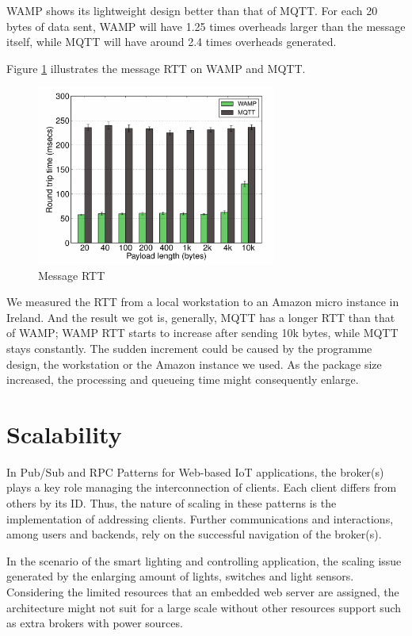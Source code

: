 WAMP shows its lightweight design better than that of MQTT. For each 20 bytes of data sent, WAMP will have 1.25 times overheads larger than the message itself, while MQTT will have around 2.4 times overheads generated. 

Figure \ref{fig:rtt} illustrates the message RTT on WAMP and MQTT.

\begin{figure}[t]
  \begin{center}
    \includegraphics[width=0.7\textwidth]{images/rtt.pdf}
    \caption{Message RTT}
    \label{fig:rtt}
  \end{center}
\end{figure}

We measured the RTT from a local workstation to an Amazon micro instance in Ireland. And the result we got is, generally, MQTT has a longer RTT than that of WAMP; WAMP RTT starts to increase after sending 10k bytes, while MQTT stays constantly. The sudden increment could be caused by the programme design, the workstation or the Amazon instance we used. As the package size increased, the processing and queueing time might consequently enlarge. 

\section{Scalability}
In Pub/Sub and RPC Patterns for Web-based IoT applications, the broker(s) plays a key role managing the interconnection of clients. Each client differs from others by its ID. Thus, the nature of scaling in these patterns is the implementation of addressing clients. Further communications and interactions, among users and backends, rely on the successful navigation of the broker(s).

In the scenario of the smart lighting and controlling application, the scaling issue generated by the enlarging amount of lights, switches and light sensors. Considering the limited resources that an embedded web server are assigned, the architecture might not suit for a large scale without other resources support such as extra brokers with power sources.

